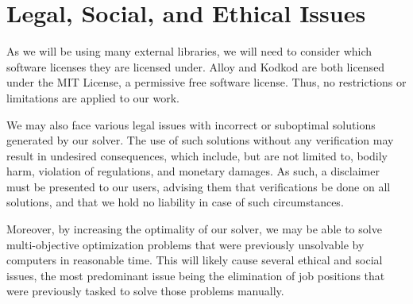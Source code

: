 \documentclass[11pt]{article}
\begin{document}
\section{Legal, Social, and Ethical Issues}
As we will be using many external libraries, we will need to consider
which software licenses they are licensed under. Alloy and Kodkod are
both licensed under the MIT License, a permissive free software
license. Thus, no restrictions or limitations are applied to our work.

We may also face various legal issues with incorrect or suboptimal
solutions generated by our solver. The use of such solutions without
any verification may result in undesired consequences, which include,
but are not limited to, bodily harm, violation of regulations, and
monetary damages. As such, a disclaimer must be presented to our
users, advising them that verifications be done on all solutions,
and that we hold no liability in case of such circumstances.

Moreover, by increasing the optimality of our solver, we may be able to
solve multi-objective optimization problems that were previously
unsolvable by computers in reasonable time. This will likely cause
several ethical and social issues, the most predominant issue being the
elimination of job positions that were previously tasked to solve those
problems manually.

\printbibliography[heading=bibintoc]
\end{document}
